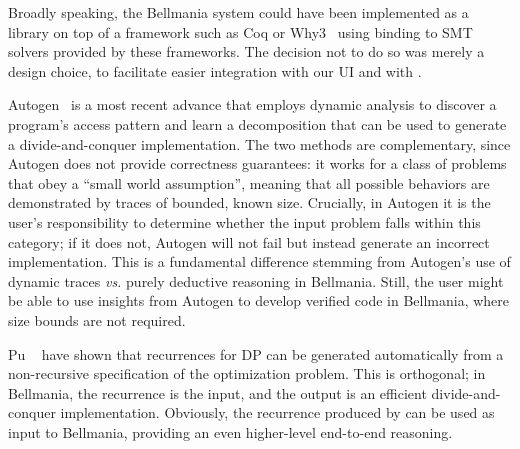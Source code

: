 Broadly speaking, the Bellmania system could have been implemented as a library on top of a framework
such as Coq or Why3~\cite{ESOP13/Filliatre} using binding to SMT solvers provided by these frameworks.
The decision not to do so was merely a design choice, to facilitate easier integration with our UI and with \Sketch{}.


Autogen~\cite{PPoPP16/Chowdhury} is a most recent advance that employs dynamic analysis to discover
a program's access pattern and learn a decomposition that can be used to generate a divide-and-conquer
implementation. The two methods are complementary,
\cbstart{}
since Autogen does not provide correctness guarantees:
it works for a class of problems that obey a ``small world assumption'', meaning that all possible behaviors are demonstrated by traces of bounded, known size.
Crucially, in Autogen it is the user's responsibility to determine whether the input problem falls within this category;
if it does not, Autogen will not fail but instead generate an incorrect implementation.
This is a fundamental difference stemming from Autogen's use of dynamic traces \textit{vs.} purely deductive reasoning in Bellmania.
Still, the user might be able to use insights from Autogen to develop verified code in Bellmania,
where size bounds are not required.
\cbend

Pu \etal{}~\cite{OOPSLA11/Pu} have shown that recurrences for DP can be generated automatically from a non-recursive specification of the optimization problem.
This is orthogonal; in Bellmania, the recurrence is the input, and the output is an efficient divide-and-conquer implementation.
\cbstart
Obviously, the recurrence produced by \cite{OOPSLA11/Pu} can be used as input to Bellmania,
providing an even higher-level end-to-end reasoning.
\cbend

\begin{comment}
Our ``$\big/$'' operator can be compared to the separating disjunction ``$\ast$'' of Separation Logic~\cite{LICS02/Reynolds},
used to frame parts of the dynamic heap (which can be thought of as one large array),
in particular while checking that a program only accesses the parts allocated to it in its precondition.
While $\ast$ has the semantics of an existentially quantified predicate, Bellmania uses type qualifiers
to explicitly specify a formula defining each part. In this sense, it is more closely related to
Region Logic~\cite{ECOOP08/Banerjee}. These formulas make encoding in first-order logic straightforward,
and the use of Liquid Types allows for any number of dimensions and for decidable checking of domain inclusion
and disjointness.
\end{comment}